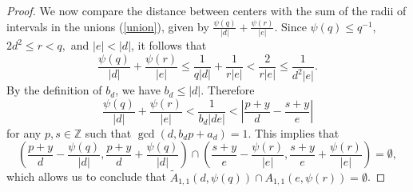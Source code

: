 \documentclass[10pt,a4paper]{amsart}
\begin{document}
\begin{proof}
    We now compare the distance between centers with the sum of the radii of intervals in the unions (\ref{union}), given by $\frac{\psi(q)}{|d|} + \frac{\psi(r)}{|e|}$. Since $\psi(q) \leq q^{-1}$, $2d^2 \leq r<q,$ and $|e|<|d|$, it follows that
    $$\frac{\psi(q)}{|d|} + \frac{\psi(r)}{|e|} \leq \frac{1}{q|d|} + \frac{1}{r|e|} < \frac{2}{r|e|} \leq \frac{1}{d^2|e|}.$$
    By the definition of $b_d$, we have $b_d \leq |d|$. Therefore
    $$\frac{\psi(q)}{|d|} + \frac{\psi(r)}{|e|} < \frac{1}{b_d |de|} < \left| \frac{p+y}{d} - \frac{s+y}{e} \right|$$
    for any $p,s \in \mathbb{Z}$ such that $\gcd(d, b_dp+a_d) = 1$. This implies that
    $$\left(\frac{p+y}{d} -\frac{\psi(q)}{|d|}, \frac{p+y}{d} + \frac{\psi(q)}{|d|} \right) \cap \left(\frac{s+y}{e} - \frac{\psi(r)}{|e|}, \frac{s+y}{e} + \frac{\psi(r)}{|e|} \right) = \emptyset,$$
    which allows us to conclude that $\tilde A_{1,1} (d, \psi(q)) \cap A_{1,1}(e, \psi(r)) = \emptyset$.
\end{proof}
\end{document}
